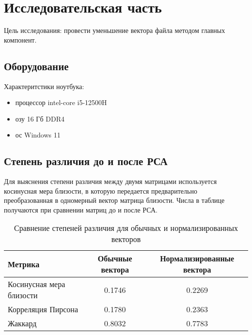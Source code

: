 \chapter{Исследовательская часть}

Цель исследования: провести уменьшение вектора файла методом главных компонент.

\section{Оборудование}

Характеритстики ноутбука:
\begin{itemize}
	\item процессор intel-core i5-12500H
	\item озу 16 Гб DDR4
	\item ос Windows 11 \cite{lib:windows}
\end{itemize}

\section{Степень различия до и после РСА}\label{diff}

Для выяснения степени различия между двумя матрицами используется косинусная мера близости, 
в которую передается предварительно преобразованная в одномерный вектор матрица близости.
Числа в таблице получаются при сравнении матриц до и после РСА.

\begin{table}[H]
    \centering
    \begin{tabular}{|l|c|c|}
    \hline
    \textbf{Метрика}                                   & \textbf{Обычные вектора} & \textbf{Нормализированные вектора} \\ \hline
    Косинусная мера близости                          & 0.1746                   & 0.2269                             \\ \hline
    Корреляция Пирсона                                & 0.1780                   & 0.2363                             \\ \hline
    Жаккард                                           & 0.8032                   & 0.7783                             \\ \hline
    \end{tabular}
    \caption{Сравнение степеней различия для обычных и нормализированных векторов}
    \label{tab:similarity}
\end{table}
    
